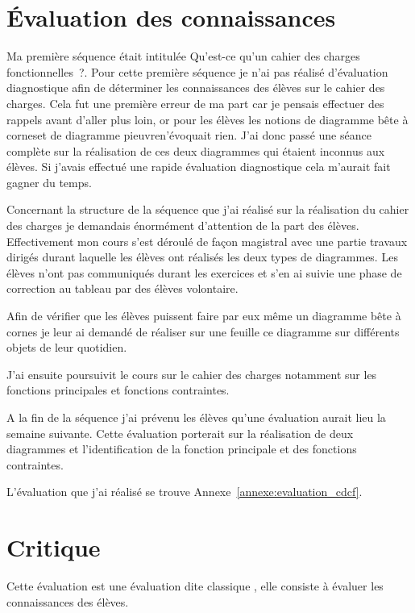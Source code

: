 
\section{Évaluation des connaissances}

Ma première séquence était intitulée \og Qu'est-ce qu'un cahier des charges fonctionnelles~?\fg. 
Pour cette première séquence je n'ai pas réalisé d'évaluation diagnostique afin de déterminer les connaissances des élèves sur le cahier des charges.
Cela fut une première erreur de ma part car je pensais effectuer des rappels avant d'aller plus loin, or pour les élèves les notions de \og diagramme bête à cornes\fg et de \og diagramme pieuvre\fg n'évoquait rien. J'ai donc passé une séance complète sur la réalisation de ces deux diagrammes qui étaient inconnus aux élèves.
Si j'avais effectué une rapide évaluation diagnostique cela m'aurait fait gagner du temps.

Concernant la structure de la séquence que j'ai réalisé sur la réalisation du cahier des charges je demandais énormément d'attention de la part des élèves.
Effectivement mon cours s'est déroulé de façon magistral avec une partie travaux dirigés durant laquelle les élèves ont réalisés les deux types de diagrammes.
Les élèves n'ont pas communiqués durant les exercices et s'en ai suivie une phase de correction au tableau par des élèves volontaire.

Afin de vérifier que les élèves puissent faire par eux même un diagramme bête à cornes je leur ai demandé de réaliser sur une feuille ce diagramme sur différents objets de leur quotidien.

J'ai ensuite poursuivit le cours sur le cahier des charges notamment sur les fonctions principales et fonctions contraintes.

A la fin de la séquence j'ai prévenu les élèves qu'une évaluation aurait lieu la semaine suivante. Cette évaluation porterait sur la réalisation de deux diagrammes et l'identification de la fonction principale et des fonctions contraintes.

L'évaluation que j'ai réalisé se trouve Annexe~\ref{annexe:evaluation_cdcf}.

\section{Critique}

Cette évaluation est une évaluation dite \og classique \fg, elle consiste à évaluer les connaissances des élèves.

